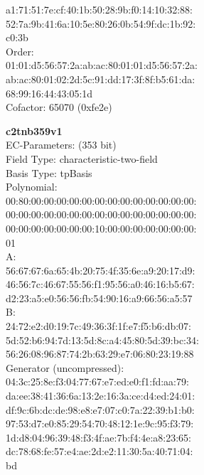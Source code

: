     a1:71:51:7e:cf:40:1b:50:28:9b:f0:14:10:32:88:\\
    52:7a:9b:41:6a:10:5e:80:26:0b:54:9f:dc:1b:92:\\
    c0:3b\\
Order: \\
    01:01:d5:56:57:2a:ab:ac:80:01:01:d5:56:57:2a:\\
    ab:ac:80:01:02:2d:5c:91:dd:17:3f:8f:b5:61:da:\\
    68:99:16:44:43:05:1d\\
Cofactor:  65070 (0xfe2e)\\
\item \textbf{ c2tnb359v1 }\\
EC-Parameters: (353 bit)\\
Field Type: characteristic-two-field\\
Basis Type: tpBasis\\
Polynomial:\\
    00:80:00:00:00:00:00:00:00:00:00:00:00:00:00:\\
    00:00:00:00:00:00:00:00:00:00:00:00:00:00:00:\\
    00:00:00:00:00:00:00:10:00:00:00:00:00:00:00:\\
    01\\
A:   \\
    56:67:67:6a:65:4b:20:75:4f:35:6e:a9:20:17:d9:\\
    46:56:7c:46:67:55:56:f1:95:56:a0:46:16:b5:67:\\
    d2:23:a5:e0:56:56:fb:54:90:16:a9:66:56:a5:57\\
B:   \\
    24:72:e2:d0:19:7c:49:36:3f:1f:e7:f5:b6:db:07:\\
    5d:52:b6:94:7d:13:5d:8c:a4:45:80:5d:39:bc:34:\\
    56:26:08:96:87:74:2b:63:29:e7:06:80:23:19:88\\
Generator (uncompressed):\\
    04:3c:25:8e:f3:04:77:67:e7:ed:e0:f1:fd:aa:79:\\
    da:ee:38:41:36:6a:13:2e:16:3a:ce:d4:ed:24:01:\\
    df:9c:6b:dc:de:98:e8:e7:07:c0:7a:22:39:b1:b0:\\
    97:53:d7:e0:85:29:54:70:48:12:1e:9c:95:f3:79:\\
    1d:d8:04:96:39:48:f3:4f:ae:7b:f4:4e:a8:23:65:\\
    dc:78:68:fe:57:e4:ae:2d:e2:11:30:5a:40:71:04:\\
    bd\\
